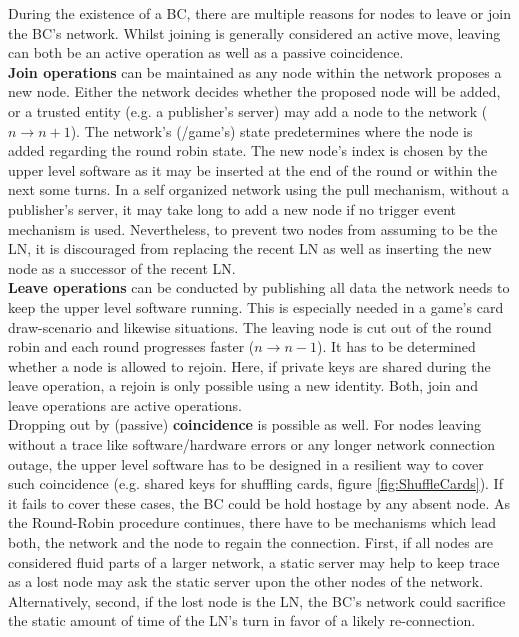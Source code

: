 During the existence of a \gls{BC}, there are multiple reasons for nodes to leave or join the \gls{BC}'s network.
Whilst joining is generally considered an active move, leaving can both be an active operation as well as a passive coincidence. \\
\textbf{Join operations} can be maintained as any node within the network proposes a new node.
Either the network decides whether the proposed node will be added, or a trusted entity (e.g. a publisher's server) may add a node to the network ($n \to n+1$).
The network's (/game's) state predetermines where the node is added regarding the round robin state. 
The new node's index is chosen by the upper level software as it may be inserted at the end of the round or within the next some turns.
In a self organized network using the pull mechanism, without a publisher's server, it may take long to add a new node if no trigger event mechanism is used.
Nevertheless, to prevent two nodes from assuming to be the \gls{LN}, it is discouraged from replacing the recent \gls{LN}  as well as inserting the new node as a successor of the recent \gls{LN}. \\
\textbf{Leave operations} can be conducted by publishing all data the network needs to keep the upper level software running.
This is especially needed in a game's card draw-scenario and likewise situations.
The leaving node is cut out of the round robin and each round progresses faster ($n \to n-1$).
It has to be determined whether a node is allowed to rejoin.
Here, if private keys are shared during the leave operation, a rejoin is only possible using a new identity.
Both, join and leave operations are active operations. \\
Dropping out by (passive) \textbf{coincidence} is possible as well.
For nodes leaving without a trace like software/hardware errors or any longer network connection outage,
the upper level software has to be designed in a resilient way to cover such coincidence (e.g. shared keys for shuffling cards, figure \ref{fig:ShuffleCards}).
If it fails to cover these cases, the \gls{BC} could be hold hostage by any absent node.
As the Round-Robin procedure continues, there have to be mechanisms which lead both, the network and the node to regain the connection.
First, if all nodes are considered fluid parts of a larger network, a static server may help to keep trace as a lost node may ask the static server upon the other nodes of the network.
Alternatively, second, if the lost node is the \gls{LN}, the \gls{BC}'s network could sacrifice the static amount of time of the \gls{LN}'s turn in favor of a likely re-connection.
